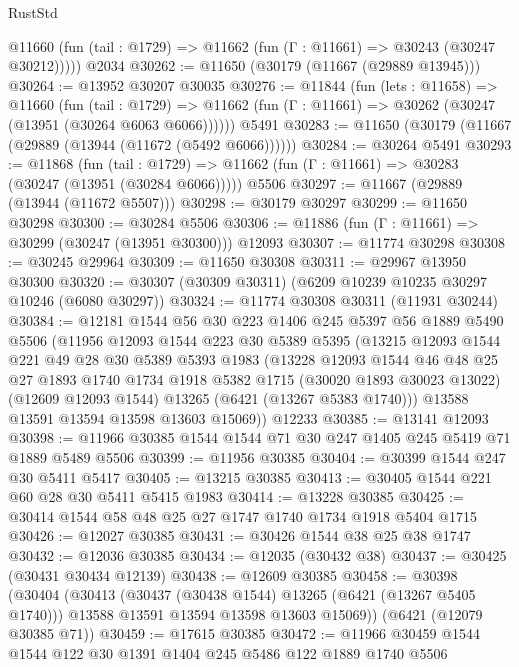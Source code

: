 \begin{lexlean}{RustStd}
\begin{coremodule}
      @11660 (fun (tail : @1729) => @11662 (fun (Γ : @11661) => @30243 (@30247 @30212)))))
    @2034
@30262 := @11650 (@30179 (@11667 (@29889 @13945)))
@30264 := @13952 @30207 @30035
@30276 := @11844
    (fun (lets : @11658) =>
    @11660
      (fun (tail : @1729) =>
      @11662 (fun (Γ : @11661) => @30262 (@30247 (@13951 (@30264 @6063 @6066))))))
    @5491
@30283 := @11650 (@30179 (@11667 (@29889 (@13944 (@11672 (@5492 @6066))))))
@30284 := @30264 @5491
@30293 := @11868
    (fun (tail : @1729) => @11662 (fun (Γ : @11661) => @30283 (@30247 (@13951 (@30284 @6066)))))
    @5506
@30297 := @11667 (@29889 (@13944 (@11672 @5507)))
@30298 := @30179 @30297
@30299 := @11650 @30298
@30300 := @30284 @5506
@30306 := @11886 (fun (Γ : @11661) => @30299 (@30247 (@13951 @30300))) @12093
@30307 := @11774 @30298
@30308 := @30245 @29964
@30309 := @11650 @30308
@30311 := @29967 @13950 @30300
@30320 := @30307 (@30309 @30311) (@6209 @10239 @10235 @30297 @10246 (@6080 @30297))
@30324 := @11774 @30308 @30311 (@11931 @30244)
@30384 := @12181
    @1544
    @56
    @30
    @223
    @1406
    @245
    @5397
    @56
    @1889
    @5490
    @5506
    (@11956
      @12093
      @1544
      @223
      @30
      @5389
      @5395
      (@13215
        @12093
        @1544
        @221
        @49
        @28
        @30
        @5389
        @5393
        @1983
        (@13228
          @12093
          @1544
          @46
          @48
          @25
          @27
          @1893
          @1740
          @1734
          @1918
          @5382
          @1715
          (@30020 @1893 @30023 @13022)
          (@12609 @12093 @1544)
          @13265
          (@6421 (@13267 @5383 @1740)))
        @13588
        @13591
        @13594
        @13598
        @13603
        @15069))
    @12233
@30385 := @13141 @12093
@30398 := @11966 @30385 @1544 @1544 @71 @30 @247 @1405 @245 @5419 @71 @1889 @5489 @5506
@30399 := @11956 @30385
@30404 := @30399 @1544 @247 @30 @5411 @5417
@30405 := @13215 @30385
@30413 := @30405 @1544 @221 @60 @28 @30 @5411 @5415 @1983
@30414 := @13228 @30385
@30425 := @30414 @1544 @58 @48 @25 @27 @1747 @1740 @1734 @1918 @5404 @1715
@30426 := @12027 @30385
@30431 := @30426 @1544 @38 @25 @38 @1747
@30432 := @12036 @30385
@30434 := @12035 (@30432 @38)
@30437 := @30425 (@30431 @30434 @12139)
@30438 := @12609 @30385
@30458 := @30398
    (@30404
      (@30413
        (@30437 (@30438 @1544) @13265 (@6421 (@13267 @5405 @1740)))
        @13588
        @13591
        @13594
        @13598
        @13603
        @15069))
    (@6421 (@12079 @30385 @71))
@30459 := @17615 @30385
@30472 := @11966 @30459 @1544 @1544 @122 @30 @1391 @1404 @245 @5486 @122 @1889 @1740 @5506

\end{coremodule}
\end{lexlean}
